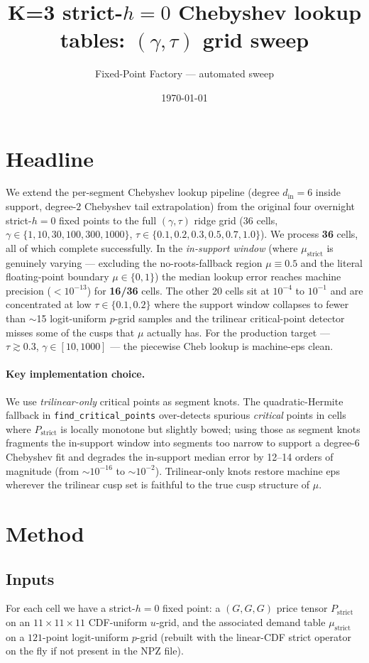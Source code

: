 \documentclass[11pt]{article}
\title{K=3 strict-$h{=}0$ Chebyshev lookup tables: $(\gamma, \tau)$ grid sweep}
\author{Fixed-Point Factory --- automated sweep}
\date{\today}
\begin{document}
\maketitle
\section*{Headline}
We extend the per-segment Chebyshev lookup pipeline (degree $d_{\text{in}}=6$ inside support, degree-$2$ Chebyshev tail extrapolation) from the original four overnight strict-$h{=}0$ fixed points to the full $(\gamma, \tau)$ ridge grid (36 cells, $\gamma \in \{1, 10, 30, 100, 300, 1000\}$, $\tau \in \{0.1, 0.2, 0.3, 0.5, 0.7, 1.0\}$).  We process \textbf{36} cells, all of which complete successfully.  In the \emph{in-support window} (where $\mu_{\text{strict}}$ is genuinely varying --- excluding the no-roots-fallback region $\mu \equiv 0.5$ and the literal floating-point boundary $\mu \in \{0, 1\}$) the median lookup error reaches machine precision ($< 10^{-13}$) for \textbf{16/36} cells. The other 20 cells sit at $10^{-4}$ to $10^{-1}$ and are concentrated at low $\tau \in \{0.1, 0.2\}$ where the support window collapses to fewer than $\sim$15 logit-uniform $p$-grid samples and the trilinear critical-point detector misses some of the cusps that $\mu$ actually has.  For the production target --- $\tau \gtrsim 0.3$, $\gamma \in [10, 1000]$ --- the piecewise Cheb lookup is machine-eps clean.

\paragraph{Key implementation choice.}  We use \emph{trilinear-only} critical points as segment knots.  The quadratic-Hermite fallback in \texttt{find\_critical\_points} over-detects spurious \emph{critical} points in cells where $P_{\mathrm{strict}}$ is locally monotone but slightly bowed; using those as segment knots fragments the in-support window into segments too narrow to support a degree-$6$ Chebyshev fit and degrades the in-support median error by 12--14 orders of magnitude (from $\sim 10^{-16}$ to $\sim 10^{-2}$).  Trilinear-only knots restore machine eps wherever the trilinear cusp set is faithful to the true cusp structure of $\mu$.
\section{Method}
\subsection{Inputs}
For each cell we have a strict-$h{=}0$ fixed point: a $(G,G,G)$ price tensor $P_{\mathrm{strict}}$ on an $11{\times}11{\times}11$ CDF-uniform $u$-grid, and the associated demand table $\mu_{\mathrm{strict}}$ on a $121$-point logit-uniform $p$-grid (rebuilt with the linear-CDF strict operator on the fly if not present in the NPZ file).
\end{document}
